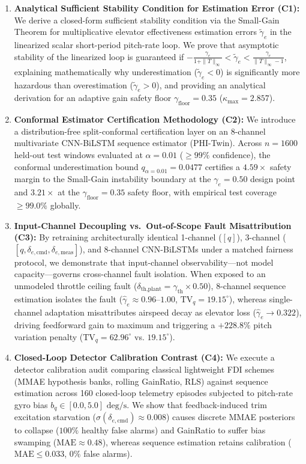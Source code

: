\documentclass[review,12pt]{elsarticle}
\begin{document}
\begin{enumerate}
    \item \textbf{Analytical Sufficient Stability Condition for Estimation Error (C1):} We derive a closed-form sufficient stability condition via the Small-Gain Theorem for multiplicative elevator effectiveness estimation errors $\tilde{\gamma}_e$ in the linearized scalar short-period pitch-rate loop. We prove that asymptotic stability of the linearized loop is guaranteed if $-\frac{\gamma_e}{1+\|T\|_\infty} < \tilde{\gamma}_e < \frac{\gamma_e}{\|T\|_\infty - 1}$, explaining mathematically why underestimation ($\tilde{\gamma}_e < 0$) is significantly more hazardous than overestimation ($\tilde{\gamma}_e > 0$), and providing an analytical derivation for an adaptive gain safety floor $\gamma_{\text{floor}} = 0.35$ ($\kappa_{\max} = 2.857$).
    
    \item \textbf{Conformal Estimator Certification Methodology (C2):} We introduce a distribution-free split-conformal certification layer on an 8-channel multivariate CNN-BiLSTM sequence estimator (PHI-Twin). Across $n = 1600$ held-out test windows evaluated at $\alpha = 0.01$ ($\ge 99\%$ confidence), the conformal underestimation bound $q_{\alpha=0.01} = 0.0477$ certifies a $4.59\times$ safety margin to the Small-Gain instability boundary at the $\gamma_e = 0.50$ design point and $3.21\times$ at the $\gamma_{\text{floor}} = 0.35$ safety floor, with empirical test coverage $\ge 99.0\%$ globally.
    
    \item \textbf{Input-Channel Decoupling vs.\ Out-of-Scope Fault Misattribution (C3):} By retraining architecturally identical 1-channel ($[q]$), 3-channel ($[q, \delta_{e,\text{cmd}}, \delta_{e,\text{meas}}]$), and 8-channel CNN-BiLSTMs under a matched fairness protocol, we demonstrate that input-channel observability—not model capacity—governs cross-channel fault isolation. When exposed to an unmodeled throttle ceiling fault ($\delta_{\text{th,plant}} = \gamma_{\text{th}} \times 0.50$), 8-channel sequence estimation isolates the fault ($\hat{\gamma}_e \approx 0.96\text{--}1.00$, $\text{TV}_q = 19.15^\circ$), whereas single-channel adaptation misattributes airspeed decay as elevator loss ($\hat{\gamma}_e \to 0.322$), driving feedforward gain to maximum and triggering a $+228.8\%$ pitch variation penalty ($\text{TV}_q = 62.96^\circ$ vs. $19.15^\circ$).
    
    \item \textbf{Closed-Loop Detector Calibration Contrast (C4):} We execute a detector calibration audit comparing classical lightweight FDI schemes (MMAE hypothesis banks, rolling GainRatio, RLS) against sequence estimation across 160 closed-loop telemetry episodes subjected to pitch-rate gyro bias $b_q \in [0.0, 5.0]\text{ deg/s}$. We show that feedback-induced trim excitation starvation ($\sigma(\delta_{e,\text{cmd}}) \approx 0.008$) causes discrete MMAE posteriors to collapse ($100\%$ healthy false alarms) and GainRatio to suffer bias swamping ($\text{MAE} \approx 0.48$), whereas sequence estimation retains calibration ($\text{MAE} \le 0.033$, $0\%$ false alarms).
\end{enumerate}
\end{document}
